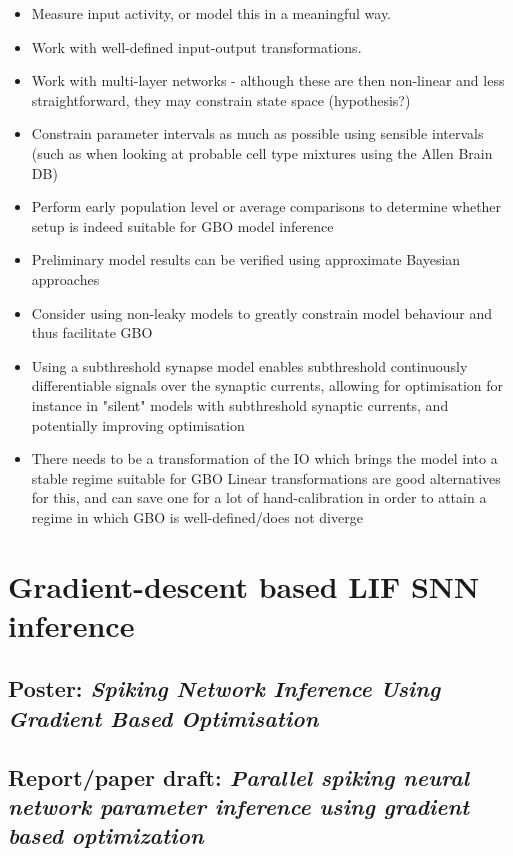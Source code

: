 \documentclass[mphil,deptreport,ai]{infthesis} %
\begin{document}
\begin{itemize}
    \item Measure input activity, or model this in a meaningful way.
    \item Work with well-defined input-output transformations.
    \item Work with multi-layer networks - although these are then non-linear and less straightforward, they may constrain state space (hypothesis?)
    \item Constrain parameter intervals as much as possible using sensible intervals (such as when looking at probable cell type mixtures using the Allen Brain DB)
    \item Perform early population level or average comparisons to determine whether setup is indeed suitable for GBO model inference
    \item Preliminary model results can be verified using approximate Bayesian approaches
    \item Consider using non-leaky models to greatly constrain model behaviour and thus facilitate GBO
    \item Using a subthreshold synapse model enables subthreshold continuously differentiable signals over the synaptic currents, allowing for optimisation for instance in "silent" models with subthreshold synaptic currents, and potentially improving optimisation
    \item There needs to be a transformation of the IO which brings the model into a stable regime suitable for GBO
        Linear transformations are good alternatives for this, and can save one for a lot of hand-calibration in order to attain a regime in which GBO is well-defined/does not diverge
\end{itemize}



\chapter{Gradient-descent based LIF SNN inference}
\section{Poster: \textit{Spiking Network Inference Using Gradient Based Optimisation}}


\section{Report/paper draft: \textit{Parallel spiking neural network parameter inference using gradient based optimization}}

\end{document}
